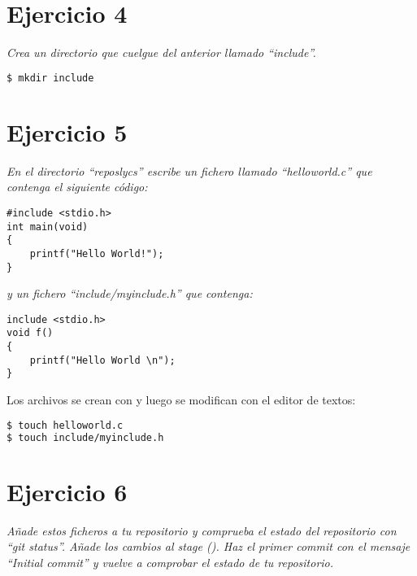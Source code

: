 \section{Ejercicio 4}
\begin{center}
    \parbox{12cm}{\justify\textit{Crea un directorio que cuelgue del anterior llamado ``include''.
    }}
\end{center}
\begin{lstlisting}[basicstyle=\small,xrightmargin=.10\textwidth,xleftmargin=.10\textwidth,language=bash]
$ mkdir include
\end{lstlisting}

\section{Ejercicio 5}
\begin{center}
    \parbox{12cm}{\justify\textit{
        En el directorio ``reposlycs'' escribe un fichero llamado “helloworld.c” que contenga el siguiente código:
    }}
\end{center}

\begin{lstlisting}[style=CStyle,xleftmargin=.3\textwidth]
#include <stdio.h>
int main(void)
{
    printf("Hello World!"); 
}\end{lstlisting}
    
\begin{center}
    \parbox{12cm}{\justify\textit{
        y un fichero ``include/myinclude.h'' que contenga:
    }}
\end{center}

\begin{lstlisting}[style=CStyle,xleftmargin=.3\textwidth]
include <stdio.h>
void f()
{
    printf("Hello World \n");
}\end{lstlisting}

Los archivos se crean con  y luego se modifican con el editor de textos:
\begin{lstlisting}[basicstyle=\small,xrightmargin=.10\textwidth,xleftmargin=.10\textwidth,language=bash]
$ touch helloworld.c
$ touch include/myinclude.h
\end{lstlisting}

\section{Ejercicio 6}
\begin{center}
    \parbox{12cm}{\justify\textit{
        Añade estos ficheros a tu repositorio y comprueba el estado del repositorio con “git status”. Añade los cambios al stage (). Haz el primer commit con el mensaje ``Initial commit'' y vuelve a comprobar el estado de tu repositorio.
    }}
\end{center}

